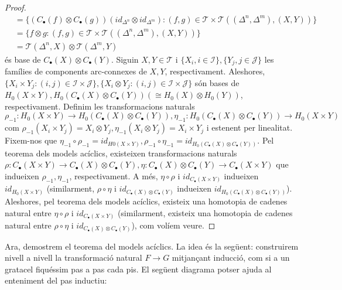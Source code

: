 \documentclass[compress]{article}
\theoremstyle{definition}
\begin{document}
\begin{proof}
\begin{align*}
        &=\{(C_{\bullet}(f)\otimes C_{\bullet}(g))(id_{\Delta^{n}}\otimes id_{\Delta^{m}}):(f,g)\in\mathscr{T}\times\mathscr{T}((\Delta^{n},\Delta^{m}),(X,Y))\}\\
        &=\{f\otimes g:(f,g)\in\mathscr{T}\times\mathscr{T}((\Delta^{n},\Delta^{m}),(X,Y))\}\\
        &=\mathscr{T}(\Delta^{n},X)\otimes\mathscr{T}(\Delta^{m},Y)
    \end{align*}
    és base de $C_{\bullet}(X)\otimes C_{\bullet}(Y)$.\newline
    Siguin $X,Y\in\mathscr{T}$ i $\{X_{i},i\in\mathscr{I}\},\{Y_{j},j\in\mathscr{J}\}$ les famílies de components arc-connexes de $X,Y$, respectivament. Aleshores, $\{X_{i}\times Y_{j}:(i,j)\in\mathscr{I}\times\mathscr{J}\},\{X_{i}\otimes Y_{j}:(i,j)\in\mathscr{I}\times\mathscr{J}\}$ són bases de $H_{0}(X\times Y),H_{0}(C_{\bullet}(X)\otimes C_{\bullet}(Y))(\cong H_{0}(X)\otimes H_{0}(Y))$, respectivament. Definim les transformacions naturals $\rho_{-1}:H_{0}(X\times Y)\rightarrow H_{0}(C_{\bullet}(X)\otimes C_{\bullet}(Y)),\eta_{-1}:H_{0}(C_{\bullet}(X)\otimes C_{\bullet}(Y))\rightarrow H_{0}(X\times Y)$ com $\rho_{-1}(X_{i}\times Y_{j})=X_{i}\otimes Y_{j},\eta_{-1}(X_{i}\otimes Y_{j})=X_{i}\times Y_{j}$ i estenent per linealitat. Fixem-nos que $\eta_{-1}\circ\rho_{-1}=id_{H{0}(X\times Y)},\rho_{-1}\circ\eta_{-1}=id_{H_{0}(C_{\bullet}(X)\otimes C_{\bullet}(Y))}$.\newline
    Pel teorema dels models acíclics, existeixen transformacions naturals $\rho:C_{\bullet}(X\times Y)\rightarrow C_{\bullet}(X)\otimes C_{\bullet}(Y),\eta:C_{\bullet}(X)\otimes C_{\bullet}(Y)\rightarrow C_{\bullet}(X\times Y)$ que indueixen $\rho_{-1},\eta_{-1}$, respectivament. A més, $\eta\circ\rho$ i $id_{C_{\bullet}(X\times Y)}$ indueixen $id_{H_{0}(X\times Y)}$ (similarment, $\rho\circ\eta$ i $id_{C_{\bullet}(X)\otimes C_{\bullet}(Y)}$ indueixen $id_{H_{0}(C_{\bullet}(X)\otimes C_{\bullet}(Y))}$). Aleshores, pel teorema dels models acíclics, existeix una homotopia de cadenes natural entre $\eta\circ\rho$ i $id_{C_{\bullet}(X\times Y)}$ (similarment, existeix una homotopia de cadenes natural entre $\rho\circ\eta$ i $id_{C_{\bullet}(X)\otimes C_{\bullet}(Y)}$), com volíem veure.
\end{proof}
Ara, demostrem el teorema del models acíclics. La idea és la següent: construirem nivell a nivell la transformació natural $F\rightarrow G$ mitjançant inducció, com si a un gratacel fiquéssim pas a pas cada pis. El següent diagrama potser ajuda al enteniment del pas inductiu:
\end{document}
